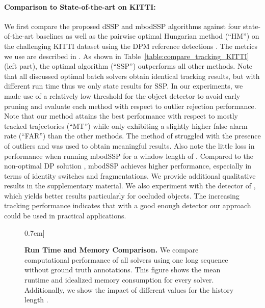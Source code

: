 \documentclass[10pt,twocolumn,letterpaper]{article}
\begin{document}
\paragraph{Comparison to State-of-the-art on KITTI:}
We first compare the proposed dSSP and mbodSSP algorithms against four state-of-the-art baselines \cite{Geiger2014PAMI,Pirsiavash2011CVPR,Andriyenko2012CVPR,Milan2014PAMI} as well as the pairwise optimal Hungarian method (``HM'') on the challenging KITTI dataset using the DPM reference detections \cite{Felzenszwalb2010PAMI}. The metrics we use are described in \cite{Li2009CVPRa,Bernardin2008JIVP}. 
As shown in Table~\ref{table:compare_tracking_KITTI} (left part), the optimal algorithm (``SSP'') outperforms all other methods. Note that all discussed optimal batch solvers obtain identical tracking results, but with different run time thus we only state results for SSP. In our experiments, we made use of a relatively low threshold  for the object detector to avoid early pruning and evaluate each method with respect to outlier rejection performance. Note that our method attains the best performance with respect to mostly tracked trajectories (``MT'') while only exhibiting a slightly higher false alarm rate (``FAR'') than the other methods.
The method of \cite{Andriyenko2012CVPR} struggled with the presence of outliers and  was used to obtain meaningful results. 
Also note the little loss in performance when running mbodSSP for a window length of .
Compared to the non-optimal DP solution \cite{Pirsiavash2011CVPR}, mbodSSP achieves higher performance, especially in terms of identity switches and fragmentations. We provide additional qualitative results in the supplementary material.
We also experiment with the detector of \cite{Wang2013ICCV}, which yields better results  particularly for occluded objects. The increasing tracking performance indicates that with a good enough detector our approach could be used in practical applications. 

\begin{figure*}[t!]
  \centering
 \hfill
 \hfill
 \-0.7em]
  \caption{\textbf{Run Time and Memory Comparison.} 
           We compare computational performance of all solvers using one long sequence without ground truth annotations. This figure shows the mean runtime \protect{} and idealized memory consumption \protect{} for every solver. Additionally, we show the impact of different values for the history length  \protect{}.
          }
  \label{fig:runtime_memory}
\vspace{0cm}
\end{figure*}
\end{document}
